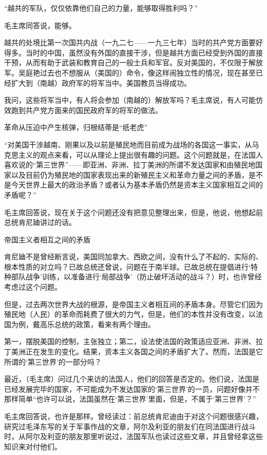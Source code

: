 “越共的军队，仅仅依靠他们自己的力量，能够取得胜利吗？”

毛主席同答说，能够。

越共的处境比第一次国共内战（一九二七——一九三七年）当时的共产党方面要好得多。当时的中国，虽然没有外国的直接干涉，但是越共方面已经受到外国的直接干预，从而有助于武装和教育自己的一般士兵和军官。反对美国的，不仅限于解放军。吴庭艳过去也不想服从（美国的）命令，像这样闹独立性的情况，现在甚至已经扩大到（南越）政府军的将军当中。美国教员当得成功。

我问，这些将军当中，有人将会参加（南越的）解放军吗？毛主席说，有人可能仿效跑到共产党方面来的国民政府军的将军的做法。

革命从压迫中产生核弹，归根结蒂是“纸老虎”

“对美国干涉越南、刚果以及以前是殖民地而目前成为战场的各国这一事实，从马克思主义的观点来看，可以从理论上提出很有趣的问题。这个问题就是，在法国人喜欢说的“第三世界”——即亚洲、非洲、拉丁美洲的所谓不发达国家和由殖民地国家以及目前仍为殖民地的国家表现出来的新殖民主义和革命力量之间的矛盾，是不是今天世界上最大的政治矛盾？或者认为基本矛盾仍然是资本主义国家相互之间的矛盾呢？”

毛主席回答说，现在关于这个问题还没有把意见整理出来，但是，他说，他想起前总统肯尼廸讲过的话。

帝国主义者相互之间的矛盾

肯尼廸不是曾经断言说，美国同加拿大、西欧之间，没有什么了不起的、实际的、根本性质的对立吗？已故总统还曾说，问题在于南半球。已故总统在提倡进行‘特种部队战争’训练，以准备进行‘局部战争’（防止破坏活动的战斗？）时，也许曾经考虑过这个问题。

但是，过去两次世界大战的根源，是帝国主义者相互间的矛盾本身。尽管它们因为殖民地（人民）的革命而耗费了很大的力气，但是，他们的本性并没有改变，以法国为例，戴高乐总统的政策，看来有两个理由。

第一，摆脱美国的控制，主张独立；第二，设法使法国的政策适应亚洲、非洲、拉丁美洲正在发生的变化。结果，资本主义各国之间的矛盾扩大了。然而，法国是它所谓的‘第三世界’的一部分吗？

最近，（毛主席）问过几个来访的法国人，他们的回答是否定的。他们说，法国是已经发展完毕的国家，不可能成为不发达国家的‘第三世界’的一员，问题好像并不那样简单“也许可以说，法国虽然在‘第三世界’里面，但是，不属于‘第三世界’？”

毛主席回答说，也许是那样。曾经读过：前总统肯尼迪由于对这个问题很感兴趣，研究过毛泽东写的关于军事作战的文章，阿尔及利亚的朋友们在同法国进行战斗时，从阿尔及利亚的朋友那里听说过，法国军队也读过这些文章，并且曾经拿这些知识来对付他们。

